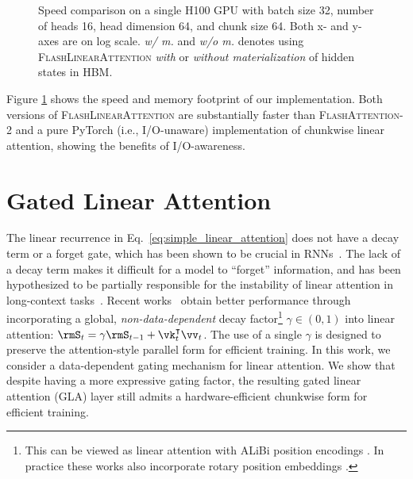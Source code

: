 \begin{figure}[t]
{   
}
\vspace{-6mm}
\caption{Speed comparison on a single H100 GPU with batch size 32, number of heads 16, head dimension 64, and chunk size 64. Both x- and y-axes are on log scale. \textit{w/ m.} and \textit{w/o m.} denotes using \textsc{FlashLinearAttention} \textit{with} or \textit{without materialization} of hidden states in HBM.}\label{fig:flashlinearattn}
\end{figure}

 Figure \ref{fig:flashlinearattn} shows the speed and memory footprint of our implementation. Both versions of \textsc{FlashLinearAttention} are substantially faster than \textsc{FlashAttention-2} \cite{flashattention2} and a pure PyTorch (i.e., I/O-unaware) implementation of chunkwise linear attention, showing the benefits of I/O-awareness. 

\vspace{-2mm}
\section{Gated Linear Attention}
\vspace{-2mm}
\label{sec:gla}

The linear recurrence in Eq.~\ref{eq:simple_linear_attention} does not have a decay term or a forget gate, which has been shown to be crucial in RNNs~\citep{HochSchm97,cho2014learning,unreasonable-forget-gate}. The lack of a decay term makes it difficult for a model to ``forget'' information, and has been hypothesized to be partially responsible for the instability of linear attention in long-context tasks~\citep{buckman2024}. Recent works~\citep{sun2023retentive,qin2023scaling} obtain better performance through incorporating a global, \emph{non-data-dependent}  decay factor\footnote{This can be viewed as linear attention with  ALiBi position encodings \cite{alibi2021}.
In practice these works also incorporate  rotary position embeddings \citep[RoPE;][]{rope}.}
$\gamma \in (0, 1)$ into linear attention:
$ \rmS_t = \gamma \rmS_{t-1} + \vk_t^\intercal \vv_t$.
The use of a single $\gamma$ is designed to preserve the attention-style parallel form for efficient training. 
In this work, we consider a data-dependent gating mechanism for linear attention. We show that despite having a more expressive gating factor, the resulting gated linear attention (GLA) layer still admits a hardware-efficient chunkwise form for efficient training.

